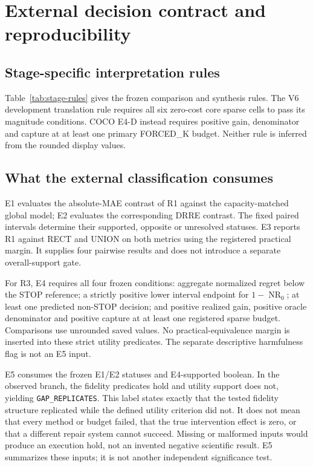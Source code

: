 \section{External decision contract and reproducibility}
\label{sec:external-reproducibility}

\subsection{Stage-specific interpretation rules}
Table~\ref{tab:stage-rules} gives the frozen comparison and synthesis rules.
The V6 development translation rule requires all six zero-cost core sparse
cells to pass its magnitude conditions. COCO E4-D instead requires positive
gain, denominator and capture at at least one primary FORCED\_K budget.
Neither rule is inferred from the rounded display values.


\subsection{What the external classification consumes}
E1 evaluates the absolute-MAE contrast of R1 against the capacity-matched
global model; E2 evaluates the corresponding DRRE contrast. The fixed
paired intervals determine their supported, opposite or unresolved
statuses. E3 reports R1 against RECT and UNION on both metrics using
the registered practical margin. It supplies four pairwise results and
does not introduce a separate overall-support gate.

For R3, E4 requires all four frozen conditions: aggregate normalized regret
below the STOP reference; a strictly positive lower interval endpoint for
$1-\operatorname{NR}_0$; at least one predicted non-STOP decision; and
positive realized gain, positive oracle denominator and positive capture
at at least one registered sparse budget. Comparisons use unrounded saved
values. No practical-equivalence margin is inserted into these strict
utility predicates. The separate descriptive harmfulness flag is not an
E5 input.


E5 consumes the frozen E1/E2 statuses and E4-supported boolean. In the
observed branch, the fidelity predicates hold and utility support does
not, yielding \texttt{GAP\_REPLICATES}. This label states exactly that
the tested fidelity structure replicated while the defined utility
criterion did not. It does not mean that every method or budget failed,
that the true intervention effect is zero, or that a different repair
system cannot succeed. Missing or malformed inputs would produce an
execution hold, not an invented negative scientific result. E5 summarizes
these inputs; it is not another independent significance test.

